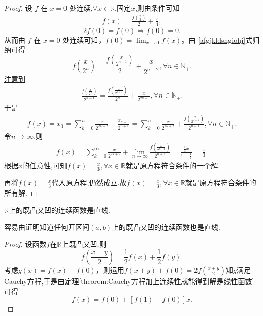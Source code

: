 \documentclass[../../main.tex]{subfiles}
\begin{document}
\begin{proof}
设 \(f\) 在 \(x = 0\) 处连续,$\forall x\in \mathbb{R}$,固定$x$,则由条件可知
\begin{align}
f(x)=\frac{f\left(\frac{x}{2}\right)}{2}+\frac{x}{4}, \label{afgjkldshgiohj}
\end{align}
\[
2f(0)=f(0)\Rightarrow f(0)=0.
\]
从而由 \(f\) 在 \(x = 0\) 处连续可知，\(f(0)=\lim_{x\rightarrow 0}f(x)\)。由 \eqref{afgjkldshgiohj}式归纳可得
\[
f\left(\frac{x}{2^n}\right)=\frac{f\left(\frac{x}{2^{n + 1}}\right)}{2}+\frac{x}{2^{n + 2}},\forall n\in \mathbb{N}_+.
\]
\hyperlink{注意到的原因见笔记部分123}{注意到}
\begin{align*}
\frac{f\left( \frac{x}{2^n} \right)}{2^{n-1}}=\frac{f\left( \frac{x}{2^{n+1}} \right)}{2^n}+\frac{x}{2^{2n+1}},\forall n\in \mathbb{N} _+.
\end{align*}
于是
\begin{align*}
f\left( x \right) =x_0=\sum_{k=0}^n{\frac{x}{2^{2k+2}}}+\frac{x_{n+1}}{2^{n+1}}=\sum_{k=0}^n{\frac{x}{2^{2k+2}}}+\frac{f\left( \frac{x}{2^{n+1}} \right)}{2^{n+1}},\forall n\in \mathbb{N} _+.
\end{align*}
令$n\rightarrow \infty$,则
\begin{align*}
f\left( x \right) =\sum_{k=0}^{\infty}{\frac{x}{2^{2k+2}}}+\underset{n\rightarrow \infty}{\lim}\frac{f\left( \frac{x}{2^{n+1}} \right)}{2^{n+1}}=\frac{\frac{1}{4}x}{1-\frac{1}{4}}=\frac{x}{3}.
\end{align*}
根据$x$的任意性,可知$f(x)=\frac{x}{3},\forall x\in \mathbb{R}$就是原方程符合条件的一个解.

再将$f(x)=\frac{x}{3}$代入原方程,仍然成立.故$f(x)=\frac{x}{3},\forall x\in \mathbb{R}$就是原方程符合条件的所有解.
\end{proof}

\begin{example}\label{example:R上的既凸又凹的连续函数是直线}
\(\mathbb{R}\)上的既凸又凹的连续函数是直线.
\end{example}
\begin{note}
容易由证明知道任何开区间\((a,b)\)上的既凸又凹的连续函数也是直线.
\end{note}
\begin{proof}
设函数$f$在$\mathbb{R}$上既凸又凹,则
\[
f\left(\frac{x + y}{2}\right)=\frac{1}{2}f(x)+\frac{1}{2}f(y).
\]
考虑\(g(x)=f(x)-f(0)\)，则运用\(f(x + y)+f(0)=2f\left(\frac{x + y}{2}\right)\)知\(g\)满足Cauchy方程,于是由\hyperref[theorem:Cauchy方程加上连续性就能得到解是线性函数]{定理\ref{theorem:Cauchy方程加上连续性就能得到解是线性函数}}可得
\[
f(x)=f(0)+[f(1)-f(0)]x.
\]
\end{proof}
\end{document}
